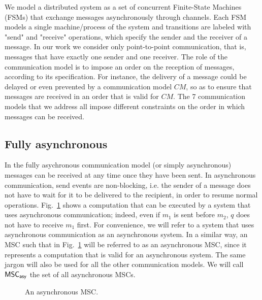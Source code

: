 We model a distributed system as a set of concurrent Finite-State Machines (FSMs) that exchange messages asynchronously through channels. Each FSM models a single machine/process of the system and transitions are labeled with "send" and "receive" operations, which specify the sender and the receiver of a message. In our work we consider only point-to-point communication, that is, messages that have exactly one sender and one receiver. The role of the communication model is to impose an order on the reception of messages, according to its specification. For instance, the delivery of a message could be delayed or even prevented by a communication model $CM$, so as to ensure that messages are received in an order that is valid for $CM$. The 7 communication models that we address all impose different constraints on the order in which messages can be received.

\subsection{Fully asynchronous}
In the fully asychronous communication model (or simply asynchronous) messages can be received at any time once they have been sent. In asynchronous communication, send events are non-blocking, i.e. the sender of a message does not have to wait for it to be delivered to the recipient, in order to resume normal operations. Fig.~\ref{fig:fully_asy_ex} shows a computation that can be executed by a system that uses asynchronous communication; indeed, even if $m_1$ is sent before $m_2$, $q$ does not have to receive $m_1$ first. For convenience, we will refer to a system that uses asynchronous communication as an asynchronous system. In a similar way, an MSC such that in Fig.~\ref{fig:fully_asy_ex} will be referred to as an asynchronous MSC, since it represents a computation that is valid for an asynchronous system. The same jargon will also be used for all the other communication models. We will call $\mathsf{MSC}_{\mathsf{asy}}$ the set of all asynchronous MSCs.

\begin{figure}[h]
	\begin{center}
		\caption{An asynchronous MSC.}
		\label{fig:fully_asy_ex}
	\end{center}
\end{figure}

